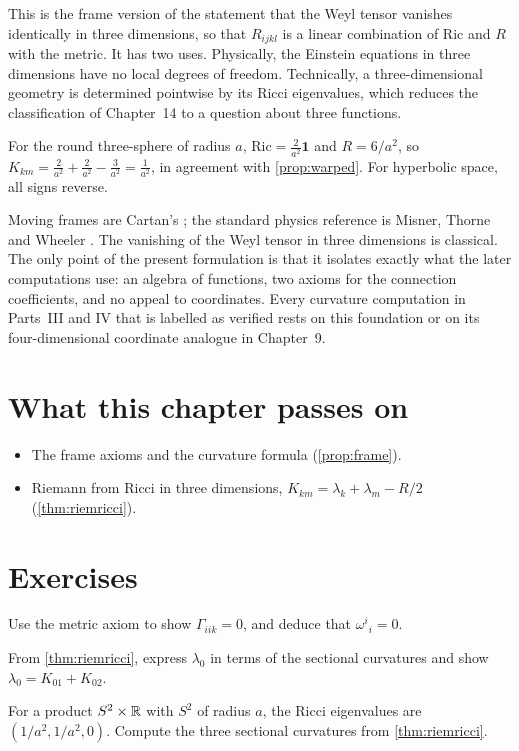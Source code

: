 This is the frame version of the statement that the Weyl tensor vanishes identically in three dimensions, so that $R_{ijkl}$ is a linear combination of $\mathrm{Ric}$ and $R$ with the metric. It has two uses. Physically, the Einstein equations in three dimensions have no local degrees of freedom. Technically, a three-dimensional geometry is determined pointwise by its Ricci eigenvalues, which reduces the classification of Chapter~14 to a question about three functions.

\begin{example}
For the round three-sphere of radius $a$, $\mathrm{Ric}=\frac{2}{a^2}\mathbf 1$ and $R=6/a^2$, so $K_{km}=\frac{2}{a^2}+\frac{2}{a^2}-\frac{3}{a^2}=\frac1{a^2}$, in agreement with \cref{prop:warped}. For hyperbolic space, all signs reverse.
\end{example}

\begin{litbox}
Moving frames are Cartan's \cite{Cartan}; the standard physics reference is Misner, Thorne and Wheeler \cite{MTW}. The vanishing of the Weyl tensor in three dimensions is classical. The only point of the present formulation is that it isolates exactly what the later computations use: an algebra of functions, two axioms for the connection coefficients, and no appeal to coordinates. Every curvature computation in Parts~III and IV that is labelled as verified rests on this foundation or on its four-dimensional coordinate analogue in Chapter~9.
\end{litbox}

\section*{What this chapter passes on}
\begin{itemize}[nosep]
\item The frame axioms and the curvature formula (\cref{prop:frame}).
\item Riemann from Ricci in three dimensions, $K_{km}=\lambda_k+\lambda_m-R/2$ (\cref{thm:riemricci}).
\end{itemize}

\section*{Exercises}
\begin{exercise}
Use the metric axiom to show $\Gamma_{iik}=0$, and deduce that $\omega^i{}_i=0$.
\end{exercise}
\begin{exercise}
From \cref{thm:riemricci}, express $\lambda_0$ in terms of the sectional curvatures and show $\lambda_0=K_{01}+K_{02}$.
\end{exercise}
\begin{exercise}
For a product $S^2\times\mathbb{R}$ with $S^2$ of radius $a$, the Ricci eigenvalues are $(1/a^2,1/a^2,0)$. Compute the three sectional curvatures from \cref{thm:riemricci}.
\end{exercise}

